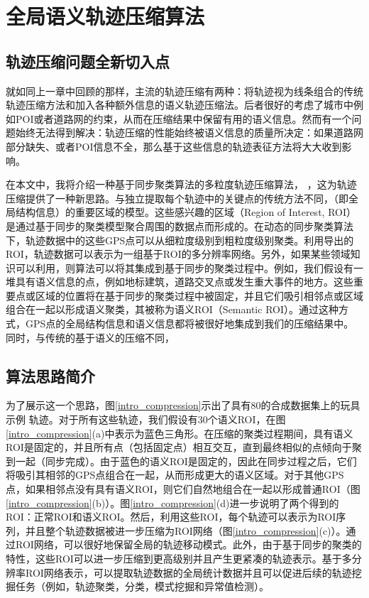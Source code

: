 
\chapter{全局语义轨迹压缩算法}
\label{chapter:main1}
\section{轨迹压缩问题全新切入点}
\label{sec:start}
就如同上一章中回顾的那样，主流的轨迹压缩有两种：将轨迹视为线条组合的传统轨迹压缩方法和加入各种额外信息的语义轨迹压缩法。后者很好的考虑了城市中例如POI或者道路网的约束，从而在压缩结果中保留有用的语义信息。然而有一个问题始终无法得到解决：轨迹压缩的性能始终被语义信息的质量所决定：如果道路网部分缺失、或者POI信息不全，那么基于这些信息的轨迹表征方法将大大收到影响。

在本文中，我将介绍一种基于同步聚类算法的多粒度轨迹压缩算法， \CascadeSync，这为轨迹压缩提供了一种新思路。与独立提取每个轨迹中的关键点的传统方法不同，（即全局结构信息）的重要区域的模型。这些感兴趣的区域（Region of Interest, ROI）是通过基于同步的聚类模型聚合周围的数据点而形成的。在动态的同步聚类算法下，轨迹数据中的这些GPS点可以从细粒度级别到粗粒度级别聚类。利用导出的ROI，轨迹数据可以表示为一组基于ROI的多分辨率网络。另外，如果某些领域知识可以利用，则算法可以将其集成到基于同步的聚类过程中。例如，我们假设有一堆具有语义信息的点，例如地标建筑，道路交叉点或发生重大事件的地方。这些重要点或区域的位置将在基于同步的聚类过程中被固定，并且它们吸引相邻点或区域组合在一起以形成语义聚类，其被称为语义ROI（Semantic ROI）。通过这种方式，GPS点的全局结构信息和语义信息都将被很好地集成到我们的压缩结果中。同时，与传统的基于语义的压缩不同，


\section{算法思路简介}
为了展示这一个思路，图\ref{intro_compression}示出了具有80的合成数据集上的玩具示例
轨迹。对于所有这些轨迹，我们假设有30个语义ROI，在图\ref{intro_compression}(a)中表示为蓝色三角形。在压缩的聚类过程期间，具有语义ROI是固定的，并且所有点（包括固定点）相互交互，直到最终相似的点倾向于聚到一起（同步完成）。由于蓝色的语义ROI是固定的，因此在同步过程之后，它们将吸引其相邻的GPS点组合在一起，从而形成更大的语义区域。对于其他GPS点，如果相邻点没有具有语义ROI，则它们自然地组合在一起以形成普通ROI（图\ref{intro_compression}(b)）。图\ref{intro_compression}(d)进一步说明了两个得到的ROI：正常ROI和语义ROI。然后，利用这些ROI，每个轨迹可以表示为ROI序列，并且整个轨迹数据被进一步压缩为ROI网络（图\ref{intro_compression}(c)）。通过ROI网络，可以很好地保留全局的轨迹移动模式。此外，由于基于同步的聚类的特性，这些ROI可以进一步压缩到更高级别并且产生更紧凑的轨迹表示。基于多分辨率ROI网络表示，可以提取轨迹数据的全局统计数据并且可以促进后续的轨迹挖掘任务（例如，轨迹聚类，分类，模式挖掘和异常值检测）。


